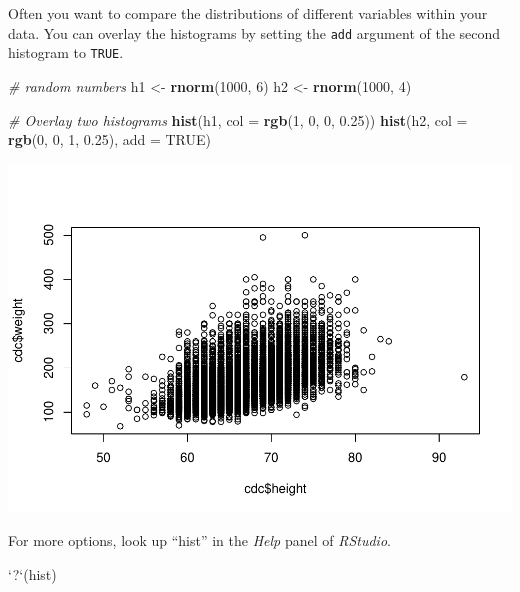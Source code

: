 \documentclass[
]{book}
\newenvironment{Shaded}{\begin{snugshade}}{\end{snugshade}}
\newcommand{\CommentTok}[1]{\textcolor[rgb]{0.56,0.35,0.01}{\textit{#1}}}
\newcommand{\DataTypeTok}[1]{\textcolor[rgb]{0.13,0.29,0.53}{#1}}
\newcommand{\DecValTok}[1]{\textcolor[rgb]{0.00,0.00,0.81}{#1}}
\newcommand{\FloatTok}[1]{\textcolor[rgb]{0.00,0.00,0.81}{#1}}
\newcommand{\KeywordTok}[1]{\textcolor[rgb]{0.13,0.29,0.53}{\textbf{#1}}}
\newcommand{\NormalTok}[1]{#1}
\newcommand{\OtherTok}[1]{\textcolor[rgb]{0.56,0.35,0.01}{#1}}
\newcommand{\StringTok}[1]{\textcolor[rgb]{0.31,0.60,0.02}{#1}}
\begin{document}
Often you want to compare the distributions of different variables within your data. You can overlay the histograms by setting the \texttt{add} argument of the second histogram to \texttt{TRUE}.

\begin{Shaded}
\begin{Highlighting}[]
\CommentTok{# random numbers}
\NormalTok{h1 <-}\StringTok{ }\KeywordTok{rnorm}\NormalTok{(}\DecValTok{1000}\NormalTok{, }\DecValTok{6}\NormalTok{)}
\NormalTok{h2 <-}\StringTok{ }\KeywordTok{rnorm}\NormalTok{(}\DecValTok{1000}\NormalTok{, }\DecValTok{4}\NormalTok{)}

\CommentTok{# Overlay two histograms}
\KeywordTok{hist}\NormalTok{(h1, }\DataTypeTok{col =} \KeywordTok{rgb}\NormalTok{(}\DecValTok{1}\NormalTok{, }\DecValTok{0}\NormalTok{, }\DecValTok{0}\NormalTok{, }\FloatTok{0.25}\NormalTok{))}
\KeywordTok{hist}\NormalTok{(h2, }\DataTypeTok{col =} \KeywordTok{rgb}\NormalTok{(}\DecValTok{0}\NormalTok{, }\DecValTok{0}\NormalTok{, }\DecValTok{1}\NormalTok{, }\FloatTok{0.25}\NormalTok{), }\DataTypeTok{add =} \OtherTok{TRUE}\NormalTok{)}
\end{Highlighting}
\end{Shaded}

\includegraphics{_main_files/figure-latex/unnamed-chunk-228-1.pdf}

For more options, look up ``hist'' in the \emph{Help} panel of \emph{RStudio}.

\begin{Shaded}
\begin{Highlighting}[]
\StringTok{`}\DataTypeTok{?}\StringTok{`}\NormalTok{(hist)}
\end{Highlighting}
\end{Shaded}
\end{document}
